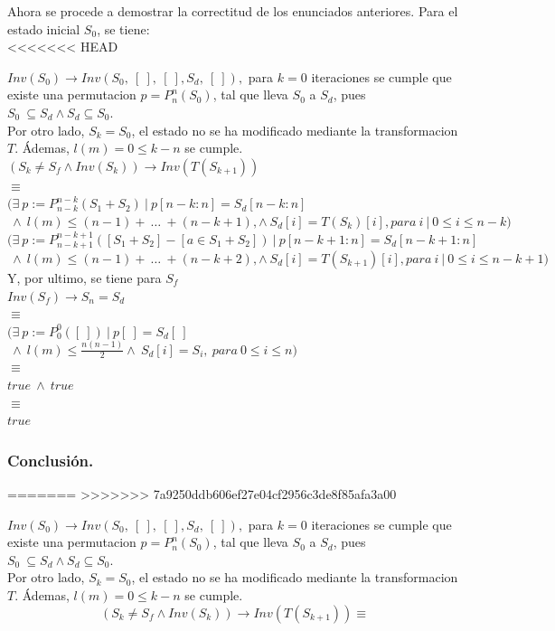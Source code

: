 \documentclass[12pt, a4paper]{article}
\begin{document}
Ahora se procede a demostrar la correctitud de los enunciados anteriores. Para el estado inicial $S_0$, se tiene: \\
<<<<<<< HEAD

$Inv(S_0) \rightarrow Inv(S_0,~[~],~[~], S_d,~[~]),$ para $k = 0$ iteraciones se cumple que existe
una permutacion $p = P_n^n(S_0)$, tal que lleva $S_0$ a $S_d$, pues $S_0~\subseteq S_d \land S_d \subseteq S_0$. \\
Por otro lado, $S_k = S_0$, el estado no se ha modificado mediante la transformacion $T$. Ádemas, $l(m) = 0 \leq k-n$ se cumple. \\
$( S_k \neq S_f \land Inv(S_k)) \rightarrow Inv(T(S_{k+1}))$ \\
$\equiv$ \\
$(\exists~p := P_{n-k}^{n-k} ( S_1  + S_2)~|~p[n-k:n] = S_d[n-k:n]$ $~\land~l(m) \leq (n-1) +~\ldots~+ (n-k+1), \land ~S_d[i] = T(S_k)[i],para~ i~|~0 \leq i \leq n-k)$ \\
$(\exists~p := P_{n-k+1}^{n-k+1} ([S_1+ S_2]-[a \in S_1 + S_2])~|~p[n-k+1:n] = S_d[n-k+1:n]$ $~\land~l(m) \leq (n-1) +~\ldots~+ (n-k+2), \land ~S_d[i] = T(S_{k+1})[i],para~ i~|~0 \leq i \leq n-k+1)$ \\
Y, por ultimo, se tiene para $S_f$ \\
$Inv(S_f) \rightarrow S_n = S_d$ \\
$\equiv$ \\
$(\exists~p := P_0^0 ([~])~|~p[~] = S_d[~]$ $~\land~l(m) \leq \frac{n(n-1)}{2} \land ~S_d[i] = S_{i}, ~para~0 \leq i \leq n)$ \\
$\equiv$ \\
$true~\land~true$ \\
$\equiv$ \\
$true$
\subsubsection{Conclusión.}
=======
>>>>>>> 7a9250ddb606ef27e04cf2956c3de8f85afa3a00

$Inv(S_0) \rightarrow Inv(S_0,~[~],~[~], S_d,~[~]),$ para $k = 0$ iteraciones se cumple que existe
una permutacion $p = P_n^n(S_0)$, tal que lleva $S_0$ a $S_d$, pues $S_0~\subseteq S_d \land S_d \subseteq S_0$. \\
Por otro lado, $S_k = S_0$, el estado no se ha modificado mediante la transformacion $T$. Ádemas, $l(m) = 0 \leq k-n$ se cumple. \\
\[( S_k \neq S_f \land Inv(S_k)) \rightarrow Inv(T(S_{k+1})) \equiv \]\\
\end{document}
